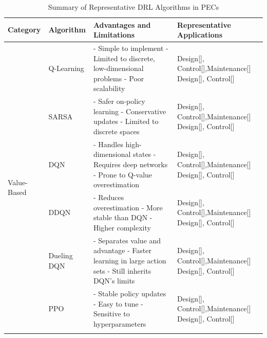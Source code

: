 \begin{table}[t]
\centering
\caption{Summary of Representative DRL Algorithms in PECs}
\label{tab:drltable}
\renewcommand{\arraystretch}{1.2}
\begin{tabular}{|l|l|p{8.2cm}|p{4.2cm}|}
\hline
\textbf{Category} & \textbf{Algorithm} & \textbf{Advantages and Limitations} & \textbf{Representative Applications} \\
\hline

\multirow{8}{*}{Value-Based}
& Q-Learning & 
- Simple to implement \newline
- Limited to discrete, low-dimensional problems \newline
- Poor scalability 
& Design[], Control[],Maintenance[] \newline
Design[], Control[]
\\
\cline{2-4}

& SARSA & 
- Safer on-policy learning \newline
- Conservative updates \newline
- Limited to discrete spaces 
& Design[], Control[],Maintenance[] \newline
Design[], Control[]
\\
\cline{2-4}

& DQN & 
- Handles high-dimensional states \newline
- Requires deep networks \newline
- Prone to Q-value overestimation 
& Design[], Control[],Maintenance[] \newline
Design[], Control[]
\\
\cline{2-4}

& DDQN & 
- Reduces overestimation \newline
- More stable than DQN \newline
- Higher complexity 
& Design[], Control[],Maintenance[] \newline
Design[], Control[]
\\
\cline{2-4}

& Dueling DQN & 
- Separates value and advantage \newline
- Faster learning in large action sets \newline
- Still inherits DQN's limits 
& Design[], Control[],Maintenance[] \newline
Design[], Control[]
\\
\cline{2-4}

\multirow{4}{*}{Policy-Based}

& PPO & 
- Stable policy updates \newline
- Easy to tune \newline
- Sensitive to hyperparameters 
& Design[], Control[],Maintenance[] \newline
Design[], Control[]
\\
\cline{2-4}


\end{tabular}
\end{table}
